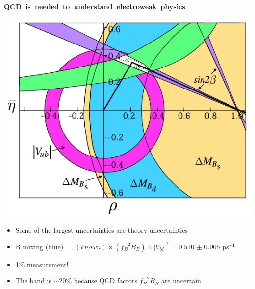 \documentclass[landscape]{article}
\newenvironment{slide}[1][ ]{\mbox{\bf \boldmath #1 } \vfill}{\vfill \vspace{-1.5 cm} \mbox{ } \pagebreak}
\newenvironment{itemizer}[1]{\begin{itemize}\setlength{\itemsep}{#1}}{\end{itemize}}
\newcommand{\inv}{$^{\mathsf{-1}}$}
\begin{document}
\begin{slide}[QCD is needed to understand electroweak physics]
  
\vfill

\begin{center}
  \includegraphics[width=0.55\linewidth]{../ckm04}
\end{center}

\begin{itemizer}{0.5 cm}

  \item Some of the largest uncertainties are theory uncertainties

  \item B mixing (blue) $= (known) \times ({f_B}^2 B_B) \times |V_{td}|^2$ = 0.510 $\pm$ 0.005 ps\inv\

  \item 1\% measurement!

  \item The band is $\sim$20\% because QCD factors ${f_B}^2 B_B$ are uncertain

\end{itemizer}

\end{slide}
\end{document}
